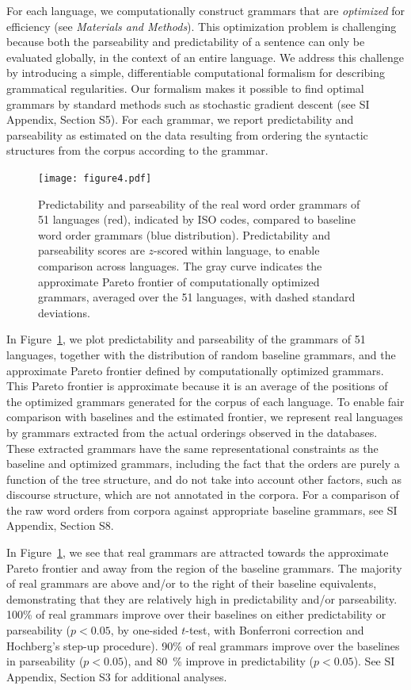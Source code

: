 \documentclass[9pt,twocolumn,twoside,lineno]{pnas-new}
\begin{document}
For each language, we computationally construct grammars that are \emph{optimized} for efficiency (see \textit{Materials and Methods}).
This optimization problem is challenging because both the parseability and predictability of a sentence can only be evaluated globally, in the context of an entire language.
We address this challenge by introducing a simple, differentiable computational formalism for describing grammatical regularities. 
Our formalism makes it possible to find optimal grammars by standard methods such as stochastic gradient descent (see SI Appendix, Section S5).
For each grammar, we report predictability and parseability as estimated on the data resulting from ordering the syntactic structures from the corpus according to the grammar.


\begin{figure}
    \centering
    \texttt{[image: figure4.pdf]}
    \caption{Predictability and parseability of the real word order grammars of 51 languages (red), indicated by ISO codes, compared to baseline word order grammars (blue distribution). Predictability and parseability scores are $z$-scored within language, to enable comparison across languages. The gray curve indicates the approximate Pareto frontier of computationally optimized grammars, averaged over the 51 languages, with dashed standard deviations.} 
    \label{fig:pareto-plane}
\end{figure}

In Figure~\ref{fig:pareto-plane}, we plot predictability and parseability of the grammars of 51 languages, together with the distribution of random baseline grammars, and the approximate Pareto frontier defined by computationally optimized grammars.
This Pareto frontier is approximate because it is an average of the positions of the optimized grammars generated for the corpus of each language.
To enable fair comparison with baselines and the estimated frontier, we represent real languages by grammars extracted from the actual orderings observed in the databases. 
These extracted grammars have the same representational constraints as the baseline and optimized grammars,
including the fact that the orders are purely a function of the tree structure, and do not take into account other factors, such as discourse structure, which are not annotated in the corpora.
For a comparison of the raw word orders from corpora against appropriate baseline grammars, see SI Appendix, Section S8.

In Figure~\ref{fig:pareto-plane}, we see that real grammars are attracted towards the approximate Pareto frontier and away from the region of the baseline grammars.
The majority of real grammars are above and/or to the right of their baseline equivalents, demonstrating that they are relatively high in predictability and/or parseability.
100\% of real grammars improve over their baselines on either predictability or parseability ($p<0.05$, by one-sided $t$-test, with Bonferroni correction and Hochberg's step-up procedure).  %
90\% of real grammars improve over the baselines in parseability ($p < 0.05$), and 80~\% improve in predictability ($p < 0.05$).
See SI Appendix, Section S3 for additional analyses.
\end{document}
